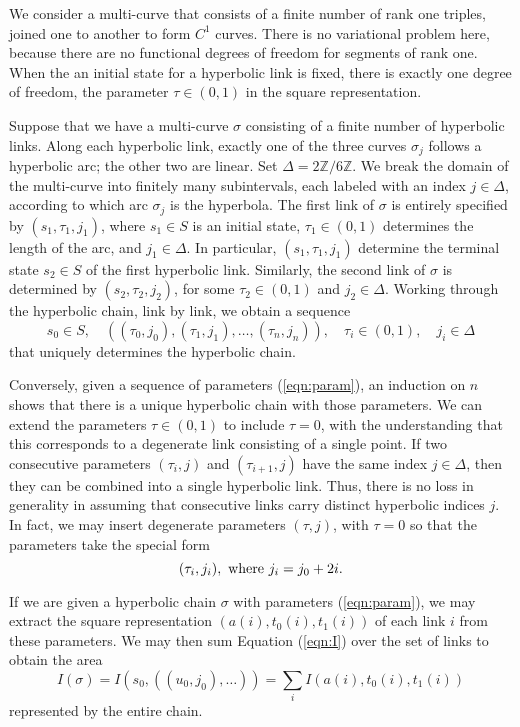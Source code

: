 \documentclass[11pt]{amsart}
\newcommand{\ring}[1]{\mathbb{#1}}
\def\ta{{\tau}}
\begin{document}
We consider a multi-curve that consists of a finite number of rank one
triples, joined one to another to form $C^1$ curves.  There is no
variational problem here, because there are no functional degrees of
freedom for segments of rank one.  When the an initial state for a
hyperbolic link is fixed, there is exactly one degree of freedom, the
parameter $\ta\in(0,1)$ in the square representation.

Suppose that we have a multi-curve $\sigma$ consisting of a finite
number of hyperbolic links.  Along each hyperbolic link, exactly one
of the three curves $\sigma_j$ follows a hyperbolic arc; the other two
are linear.  Set $\Delta=2\ring{Z}/6\ring{Z}$.  We break the domain of
the multi-curve into finitely many subintervals, each labeled with an
index $j\in\Delta$, according to which arc $\sigma_j$ is the
hyperbola.  The first link of $\sigma$ is entirely specified by
$(s_1,\ta_1,j_1)$, where $s_1\in S$ is an initial state,
$\ta_1\in(0,1)$ determines the length of the arc, and $j_1\in\Delta$.
In particular, $(s_1,\ta_1,j_1)$ determine the terminal state $s_2\in
S$ of the first hyperbolic link.  Similarly, the second link of
$\sigma$ is determined by $(s_2,\ta_2,j_2)$, for some $\ta_2\in (0,1)$
and $j_2\in\Delta$.  Working through the hyperbolic chain, link by
link, we obtain a sequence
\begin{equation}\label{eqn:param}
  s_0\in S,\quad ((\ta_0,j_0),(\ta_1,j_1),\ldots,(\ta_n,j_n)),\quad \ta_i\in(0,1),\quad j_i\in\Delta
\end{equation}
that uniquely determines the hyperbolic chain.

Conversely, given a sequence of parameters (\ref{eqn:param}), an
induction on $n$ shows that there is a unique hyperbolic chain with
those parameters.  We can extend the parameters $\ta\in (0,1)$ to
include $\ta=0$, with the understanding that this corresponds to a
degenerate link consisting of a single point.  If two consecutive
parameters $(\ta_i,j)$ and $(\ta_{i+1},j)$ have the same index
$j\in\Delta$, then they can be combined into a single hyperbolic link.
Thus, there is no loss in generality in assuming that consecutive
links carry distinct hyperbolic indices $j$.  In fact, we may insert
degenerate parameters $(\ta,j)$, with $\ta=0$ so that the parameters
take the special form
\begin{equation}\label{eqn:ji}
  (\ta_i,j_i),\hbox{ where } j_i = j_0 + 2 i.
\end{equation}

If we are given a hyperbolic chain $\sigma$ 
with parameters (\ref{eqn:param}),
we may extract the square representation $(a(i),t_0(i),t_1(i))$
of each
link $i$ from these parameters.  We may then sum Equation (\ref{eqn:I})
over the set of links to obtain the area
\begin{equation}\label{eqn:Isigma}
I(\sigma) = I(s_0,((u_0,j_0),\ldots)) = \sum_i I(a(i),t_0(i),t_1(i))
\end{equation}
represented by the entire chain.
\end{document}
